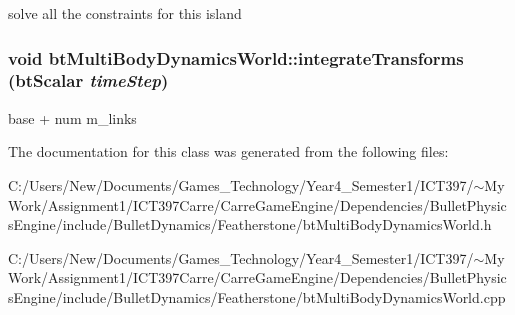 solve all the constraints for this island \hypertarget{classbt_multi_body_dynamics_world_6abe9896c6178b8d5bebdbca53fa7a74}{
\subsubsection[integrateTransforms]{\setlength{\rightskip}{0pt plus 5cm}void btMultiBodyDynamicsWorld::integrateTransforms (btScalar {\em timeStep})}}
\label{classbt_multi_body_dynamics_world_6abe9896c6178b8d5bebdbca53fa7a74}




base + num m\_\-links 

The documentation for this class was generated from the following files:\begin{CompactItemize}
\item 
C:/Users/New/Documents/Games\_\-Technology/Year4\_\-Semester1/ICT397/$\sim$My Work/Assignment1/ICT397Carre/CarreGameEngine/Dependencies/BulletPhysicsEngine/include/BulletDynamics/Featherstone/btMultiBodyDynamicsWorld.h\item 
C:/Users/New/Documents/Games\_\-Technology/Year4\_\-Semester1/ICT397/$\sim$My Work/Assignment1/ICT397Carre/CarreGameEngine/Dependencies/BulletPhysicsEngine/include/BulletDynamics/Featherstone/btMultiBodyDynamicsWorld.cpp\end{CompactItemize}

